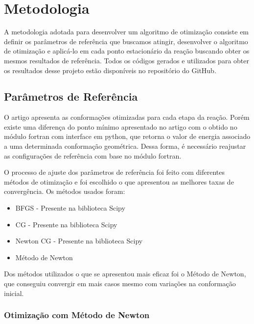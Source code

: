 \section{Metodologia}
\label{sec:methodology}

A metodologia adotada para desenvolver um algoritmo de otimização consiste em definir os parâmetros de referência que buscamos atingir, desenvolver o algoritmo de otimização e aplicá-lo em cada ponto estacionário da reação buscando obter os mesmos resultados de referência. Todos os códigos gerados e utilizados para obter os resultados desse projeto estão disponíveis no repositório do GitHub\cite{Research_Software_Algorithm_2023}.

\subsection{Parâmetros de Referência}

O artigo \cite{fh2o_first_sep} apresenta as conformações otimizadas para cada etapa da reação. Porém existe uma diferença do ponto mínimo apresentado no artigo com o obtido no módulo fortran\cite{fh2o_sep_fortran_module} com interface em python, que retorna o valor de energia associado a uma determinada conformação geométrica. Dessa forma, é necessário reajustar as configurações de referência com base no módulo fortran.

O processo de ajuste dos parâmetros de referência foi feito com diferentes métodos de otimização e foi escolhido o que apresentou as melhores taxas de convergência. Os métodos usados foram:
%
\begin{itemize}
  \setlength\itemsep{0pt}
  \setlength\parsep{0pt}
  \item BFGS - Presente na biblioteca Scipy \cite{scipy}
  \item CG - Presente na biblioteca Scipy \cite{scipy}
  \item Newton CG - Presente na biblioteca Scipy \cite{scipy}
  \item Método de Newton
\end{itemize}
%
Dos métodos utilizados o que se apresentou mais eficaz foi o Método de Newton, que conseguiu convergir em mais casos mesmo com variações na conformação inicial.

\subsubsection{Otimização com Método de Newton}

